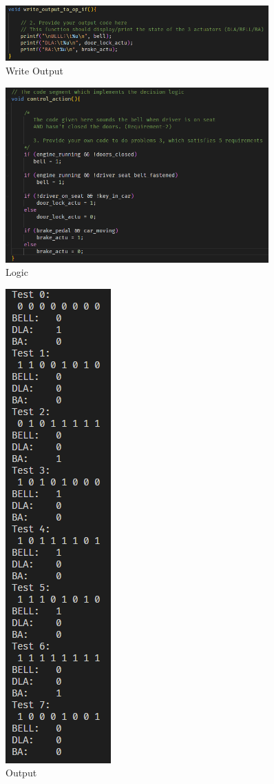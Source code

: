 \begin{enumerate}[a)]
    \begin{figure}[h!]
        \centering
        \includegraphics[width=0.9\textwidth]{Images/3a Code Write.png}
        \caption{Write Output}
    \end{figure}
    
    \begin{figure}[h!]
        \centering
        \includegraphics[width=0.9\textwidth]{Images/3a Code Logic.png}
        \caption{Logic}
    \end{figure}

    \begin{figure}[h!]
        \centering
        \includegraphics{Images/3d Output.png}
        \caption{Output}
    \end{figure}
\end{enumerate}
